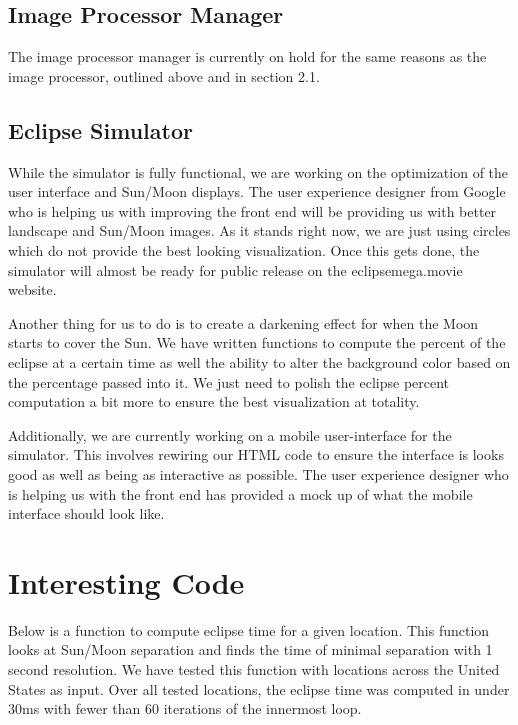 \documentclass[10pt, onecolumn, draftclsnofoot, letterpaper, compsoc]{IEEEtran}
\begin{document}
\subsection{Image Processor Manager}

The image processor manager is currently on hold for the same reasons as the image
processor, outlined above and in section 2.1.

\subsection{Eclipse Simulator}

While the simulator is fully functional, we are working on the optimization
of the user interface and Sun/Moon displays. The user experience designer
from Google who is helping us with improving the front end will be providing
us with better landscape and Sun/Moon images. As it stands right now, we are
just using circles which do not provide the best looking visualization. Once this
gets done, the simulator will almost be ready for public release on the eclipsemega.movie
website.

Another thing for us to do is to create a darkening effect for when the Moon starts to
cover the Sun. We have written functions to compute the percent of the eclipse
at a certain time as well the ability to alter the background color based on
the percentage passed into it. We just need to polish the eclipse percent computation
a bit more to ensure the best visualization at totality.

Additionally, we are currently working on a mobile user-interface for the
simulator. This involves rewiring our HTML code to ensure the interface is looks
good as well as being as interactive as possible. The user experience designer
who is helping us with the front end has provided a mock up of what the mobile
interface should look like.


\section{Interesting Code}

Below is a function to compute eclipse time for a given location. This function looks at Sun/Moon
separation and finds the time of minimal separation with 1 second resolution. We have tested
this function with locations across the United States as input. Over all tested locations, the
eclipse time was computed in under 30ms with fewer than 60 iterations of the innermost loop. \\
\end{document}
